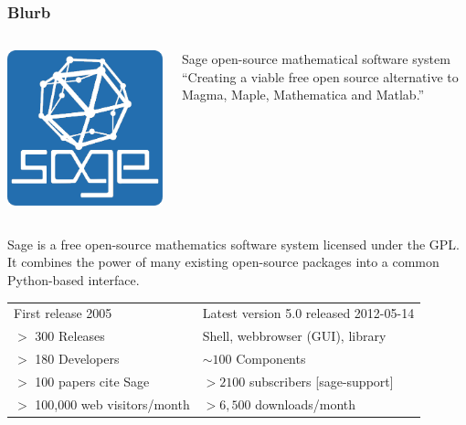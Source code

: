 \documentclass[10pt]{beamer}
\begin{document}
\begin{frame}
\frametitle{Blurb}

\begin{columns}


\begin{center}
 \includegraphics[height=0.95\textwidth]{./sage-logo.png}
\end{center}

\begin{block}{Sage open-source mathematical software system}
``Creating a viable free open source alternative to Magma, Maple, Mathematica and Matlab.''
\end{block}
\end{columns}

\vspace{1em}

Sage is a free open-source mathematics software system licensed under the GPL. It combines the power of many existing open-source packages into a common Python-based interface.

\vspace{1em}

\begin{tabular}{ll}
First release 2005 & Latest version 5.0 released 2012-05-14\\
$>$ 300 Releases  & Shell, webbrowser (GUI), library\\
$>$ 180 Developers  & $\sim 100$ Components\\
$>$ 100 papers cite Sage & $> 2100$ subscribers [sage-support]\\
$>$ 100,000 web visitors/month&  $> 6,500$ downloads/month\\
\end{tabular}
\end{frame}
\end{document}
